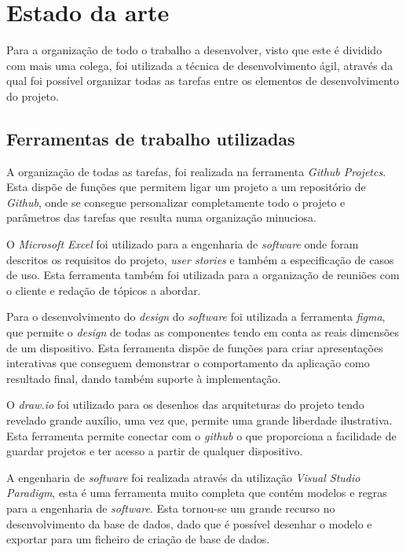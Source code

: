 
\chapter{Estado da arte}
Para a organização de todo o trabalho a desenvolver, visto que este é dividido com mais uma colega, foi utilizada a técnica de desenvolvimento ágil, através da qual foi possível organizar todas as tarefas entre os elementos de desenvolvimento do projeto.

\section{Ferramentas de trabalho utilizadas}

A organização de todas as tarefas, foi realizada na ferramenta \textit{Github Projetcs}. Esta dispõe de funções que permitem ligar um projeto a um repositório de \textit{Github}, onde se consegue personalizar completamente todo o projeto e parâmetros das tarefas que resulta numa organização minuciosa.

O \textit{Microsoft Excel} foi utilizado para a engenharia de \textit{software} onde foram descritos os requisitos do projeto, \textit{user stories} e também a especificação de casos de uso. Esta ferramenta também foi utilizada para a organização de reuniões com o cliente e redação de tópicos a abordar.

Para o desenvolvimento do \textit{design} do \textit{software} foi utilizada a ferramenta \textit{figma}, que permite o \textit{design} de todas as componentes tendo em conta as reais dimensões de um dispositivo. Esta ferramenta dispõe de funções para criar apresentações interativas que conseguem demonstrar o comportamento da aplicação como resultado final, dando também suporte à implementação.

O \textit{draw.io} foi utilizado para os desenhos das arquiteturas do projeto tendo revelado grande auxílio, uma vez que, permite uma grande liberdade ilustrativa. Esta ferramenta permite conectar com o \textit{github} o que proporciona a facilidade de guardar projetos e ter acesso a partir de qualquer dispositivo.

A engenharia de \textit{software} foi realizada através da utilização \textit{Visual Studio Paradigm}, esta é uma ferramenta muito completa que contém modelos e regras para a engenharia de \textit{software}. Esta tornou-se um grande recurso no desenvolvimento da base de dados, dado que é possível desenhar o modelo e exportar para um ficheiro de criação de base de dados.

